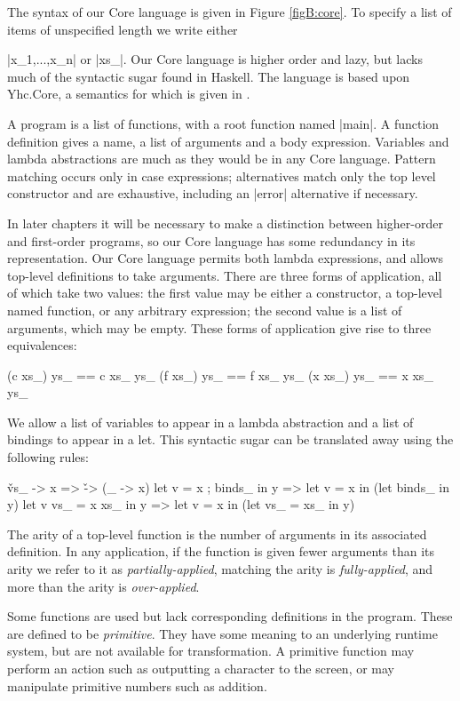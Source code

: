 The syntax of our Core language is given in Figure \ref{figB:core}. To specify a list of items of unspecified length we write either \ignore|x_1,...,x_n| or |xs_|. Our Core language is higher order and lazy, but lacks much of the syntactic sugar found in Haskell. The language is based upon Yhc.Core, a semantics for which is given in \cite{me:yhc_core}.

A program is a list of functions, with a root function named |main|. A function definition gives a name, a list of arguments and a body expression. Variables and lambda abstractions are much as they would be in any Core language.  Pattern matching occurs only in case expressions; alternatives match only the top level constructor and are exhaustive, including an |error| alternative if necessary.

In later chapters it will be necessary to make a distinction between higher-order and first-order programs, so our Core language has some redundancy in its representation. Our Core language permits both lambda expressions, and allows top-level definitions to take arguments. There are three forms of application, all of which take two values: the first value may be either a constructor, a top-level named function, or any arbitrary expression; the second value is a list of arguments, which may be empty. These forms of application give rise to three equivalences:

\ignore\begin{code}
(c  xs_) ys_ == c  xs_ ys_
(f  xs_) ys_ == f  xs_ ys_
(x  xs_) ys_ == x  xs_ ys_
\end{code}

We allow a list of variables to appear in a lambda abstraction and a list of bindings to appear in a let. This syntactic sugar can be translated away using the following rules:

\ignore\begin{code}
\v vs_ -> x              => \v -> (\vs_ -> x)
let v = x ; binds_ in y  => let v = x in (let binds_ in y)
let v vs_ = x xs_ in y   => let v = x in (let vs_ = xs_ in y)
\end{code}

The arity of a top-level function is the number of arguments in its associated definition. In any application, if the function is given fewer arguments than its arity we refer to it as \textit{partially-applied}, matching the arity is \textit{fully-applied}, and more than the arity is \textit{over-applied}.

Some functions are used but lack corresponding definitions in the program. These are defined to be \textit{primitive}. They have some meaning to an underlying runtime system, but are not available for transformation. A primitive function may perform an action such as outputting a character to the screen, or may manipulate primitive numbers such as addition.

